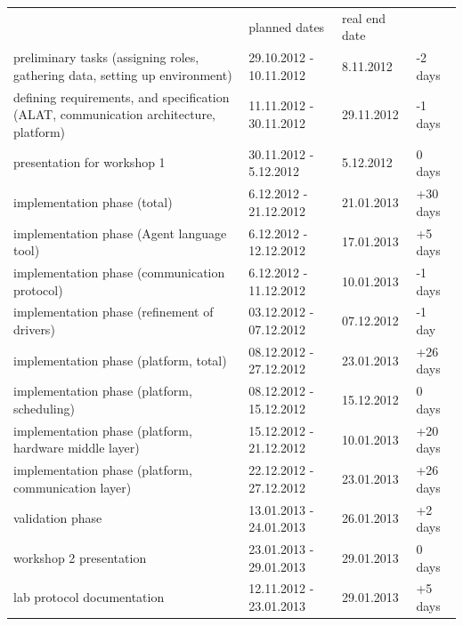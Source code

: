 \documentclass{scrreprt}
\begin{document}
\begin{tabular}{|>{\raggedright}m{5cm}|l|l|l|}
\hline \multicolumn{4}{|c|}{\textbf{Planned and real dates}}\\
\hline
			&  planned dates			& real end date		& 		\\\hline
preliminary tasks (assigning roles, gathering data, setting up environment)
&  29.10.2012 - 10.11.2012		& 8.11.2012	 	& -2 days	\\\hline

defining requirements, and specification (ALAT, communication architecture, platform)
&  11.11.2012 - 30.11.2012		& 29.11.2012	 	& -1 days	\\\hline

presentation for workshop 1
&  30.11.2012 - 5.12.2012				& 5.12.2012	 	& 0 days	\\\hline

implementation phase (total)
&  6.12.2012 - 21.12.2012			& 21.01.2013	 	& +30 days	\\\hline

implementation phase (Agent language tool)
&  6.12.2012 - 12.12.2012			& 17.01.2013	 	& +5 days	\\\hline

implementation phase (communication protocol)
&  6.12.2012 - 11.12.2012			& 10.01.2013	 	& -1 days	\\\hline

implementation phase (refinement of drivers)
&  03.12.2012 - 07.12.2012			& 07.12.2012	 	& -1 day	\\\hline

implementation phase (platform, total)
&  08.12.2012 - 27.12.2012			& 23.01.2013	 	& +26 days	\\\hline

implementation phase (platform, scheduling)
&  08.12.2012 - 15.12.2012			& 15.12.2012	 	& 0 days	\\\hline

implementation phase (platform, hardware middle layer)
&  15.12.2012 - 21.12.2012			& 10.01.2013	 	& +20 days	\\\hline

implementation phase (platform, communication layer)
&  22.12.2012 - 27.12.2012			& 23.01.2013	 	& +26 days	\\\hline

validation phase
&  13.01.2013 - 24.01.2013			& 26.01.2013	 	& +2 days	\\\hline

workshop 2 presentation
&  23.01.2013 - 29.01.2013			& 29.01.2013	 	& 0 days	\\\hline

lab protocol documentation
&  12.11.2012 - 23.01.2013			& 29.01.2013	 	& +5 days	\\\hline

\hline
\end{tabular}
\end{document}
